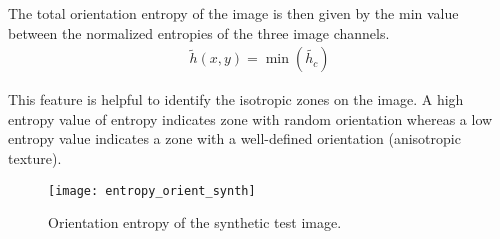The total orientation entropy of the image is then given by the min value between the normalized entropies of the three image channels. 
\begin{gather}
    \widetilde{h}(x,y) = \min(\widetilde{h_c}) \label{eq:entropy_orient}
\end{gather}

This feature is helpful to identify the isotropic zones on the image. A high entropy value of entropy indicates zone with random orientation whereas a low entropy value indicates a zone with a well-defined orientation (anisotropic texture).

\begin{figure}[!ht]
	\texttt{[image: entropy\_orient\_synth]}
    \caption{Orientation entropy of the synthetic test image.}
    \label{fig:entropy_orient_synth}
\end{figure}

%                  

